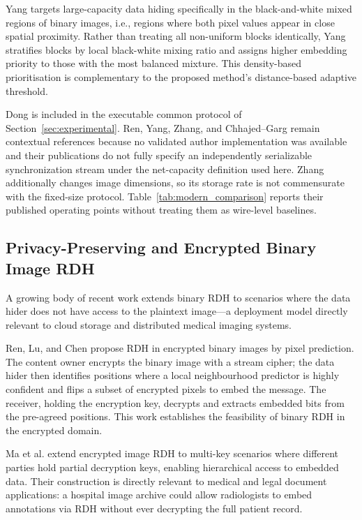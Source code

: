 \documentclass[a4paper,fleqn]{cas-dc}
\begin{document}
Yang \cite{Yang2023Large} targets large-capacity data hiding specifically in the black-and-white mixed regions of binary images, i.e., regions where both pixel values appear in close spatial proximity. Rather than treating all non-uniform blocks identically, Yang stratifies blocks by local black-white mixing ratio and assigns higher embedding priority to those with the most balanced mixture. This density-based prioritisation is complementary to the proposed method's distance-based adaptive threshold.

Dong is included in the executable common protocol of
Section~\ref{sec:experimental}. Ren, Yang, Zhang, and Chhajed--Garg remain
contextual references because no validated author implementation was available
and their publications do not fully specify an independently serializable
synchronization stream under the net-capacity definition used here. Zhang
additionally changes image dimensions, so its storage rate is not commensurate
with the fixed-size protocol. Table~\ref{tab:modern_comparison} reports their
published operating points without treating them as wire-level baselines.

\subsection{Privacy-Preserving and Encrypted Binary Image RDH}

A growing body of recent work extends binary RDH to scenarios where the data hider does not have access to the plaintext image---a deployment model directly relevant to cloud storage and distributed medical imaging systems.

Ren, Lu, and Chen \cite{Ren2019Encrypted} propose RDH in encrypted binary images by pixel prediction. The content owner encrypts the binary image with a stream cipher; the data hider then identifies positions where a local neighbourhood predictor is highly confident and flips a subset of encrypted pixels to embed the message. The receiver, holding the encryption key, decrypts and extracts embedded bits from the pre-agreed positions. This work establishes the feasibility of binary RDH in the encrypted domain.

Ma et al. \cite{Ma2021RDHEncrypted} extend encrypted image RDH to multi-key scenarios where different parties hold partial decryption keys, enabling hierarchical access to embedded data. Their construction is directly relevant to medical and legal document applications: a hospital image archive could allow radiologists to embed annotations via RDH without ever decrypting the full patient record.
\end{document}
